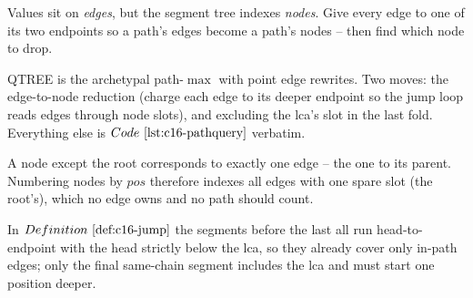\begin{attemptgate}
Values sit on \emph{edges}, but the segment tree indexes \emph{nodes}.  Give every edge to one of its two endpoints so a path's edges become a path's nodes -- then find which node to drop.
\end{attemptgate}

QTREE is the archetypal path-\(\max\) with point edge rewrites. Two moves: the edge-to-node reduction (charge each edge to its deeper endpoint so the jump loop reads edges through node slots), and excluding the lca's slot in the last fold. Everything else is \(\coderef{c16-pathquery}\) verbatim.

\begin{observation}
A node except the root corresponds to exactly one edge -- the one to its parent. Numbering nodes by \(\mathit{pos}\) therefore indexes all edges with one spare slot (the root's), which no edge owns and no path should count.
\end{observation}
\begin{observation}
In \(\defref{c16-jump}\) the segments before the last all run head-to-endpoint with the head strictly below the lca, so they already cover only in-path edges; only the final same-chain segment includes the lca and must start one position deeper.
\end{observation}

